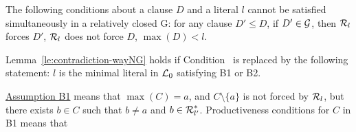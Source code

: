 \begin{PROOF}
 \begin{LEMMA}\label {le:contradiction-wayNG}
The following conditions about a clause $D$ and a literal $l$ cannot be 
satisfied simultaneously in a relatively closed \C G:
\setcounter{ITEM}{0}
 {for any clause \(D'\leq D\), if \(D'\in\mbox {$\cal G$}\), then \(\mbox {$\cal R$}_l\)
forces $D'$,}
 {\(\mbox {$\cal R$}_l\) does not force $D$,}
 {\(\max(D)<l\).}
 \end{LEMMA}
%
\begin{COROLLARY} \label{cor:contradiction-wayNG}
Lemma~\ref {le:contradiction-wayNG} holds if Condition~ is replaced by the
following  statement:  $l$ is the minimal literal in \(\mbox {$\cal L$}_0\) satisfying
B1 or B2.
\end{COROLLARY}
%
\underline{Assumption B1} means that
 \(\max(C)=a\), and \(C\setminus\{a\}\) is not forced by \(\mbox {$\cal R$}_l\),
but there exists \(b\in C\) such that \(b\neq a\) and \(b\in \mbox {$\cal R$}_{l'}^\ast\).
Productiveness conditions for $C$ in B1 means that

\end{PROOF}
